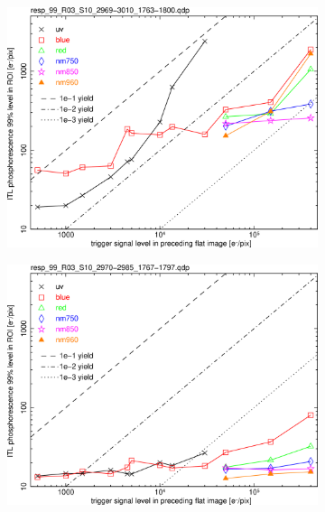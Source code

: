 \begin{figure}[!htbp]
\centering
\begin{subfigure}{0.45\textwidth}    
  \centering
  \includegraphics[width=\textwidth]{figures/phosphorescence-survey/phos_resp/resp_99_R03_S10_2969-3010_1763-1800.png}    
\end{subfigure}
\newline
\centering
\begin{subfigure}{0.45\textwidth}    
  \centering
  \includegraphics[width=\textwidth]{figures/phosphorescence-survey/phos_resp/resp_99_R03_S10_2970-2985_1767-1797.png}    
\end{subfigure}
\newline

\end{figure}
